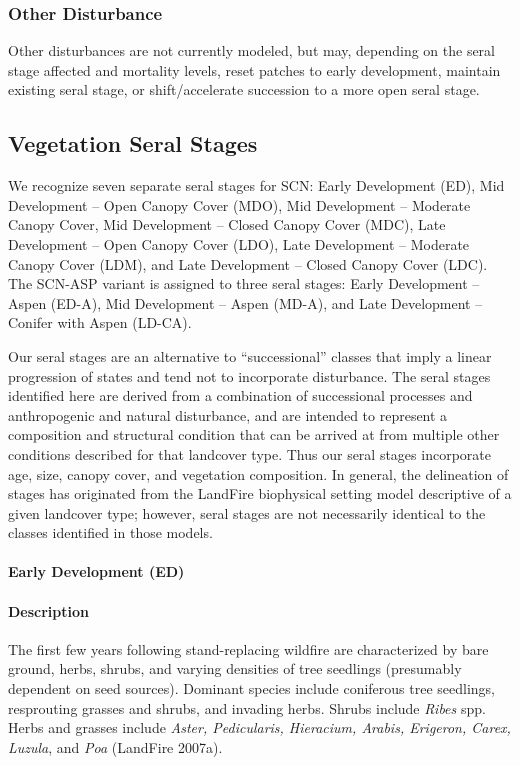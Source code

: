 \subsubsection{Other Disturbance}
Other disturbances are not currently modeled, but may, depending on the seral stage affected and mortality levels, reset patches to early development, maintain existing seral stage, or shift/accelerate succession to a more open seral stage. 

\subsection*{Vegetation Seral Stages}
We recognize seven separate seral stages for SCN: Early Development (ED), Mid Development – Open Canopy Cover (MDO), Mid Development – Moderate Canopy Cover, Mid Development – Closed Canopy Cover (MDC), Late Development – Open Canopy Cover (LDO), Late Development – Moderate Canopy Cover (LDM), and Late Development – Closed Canopy Cover (LDC). The SCN-ASP variant is assigned to three seral stages: Early Development – Aspen (ED-A), Mid Development – Aspen (MD-A), and Late Development – Conifer with Aspen (LD-CA).

Our seral stages are an alternative to ``successional'' classes that imply a linear progression of states and tend not to incorporate disturbance. The seral stages identified here are derived from a combination of successional processes and anthropogenic and natural disturbance, and are intended to represent a composition and structural condition that can be arrived at from multiple other conditions described for that landcover type. Thus our seral stages incorporate age, size, canopy cover, and vegetation composition. In general, the delineation of stages has originated from the LandFire biophysical setting model descriptive of a given landcover type; however, seral stages are not necessarily identical to the classes identified in those models.


\paragraph{Early Development (ED)}

\paragraph{Description} The first few years following stand-replacing wildfire are characterized by bare ground, herbs, shrubs, and varying densities of tree seedlings (presumably dependent on seed sources). Dominant species include coniferous tree seedlings, resprouting grasses and shrubs, and invading herbs. Shrubs include \emph{Ribes} spp. Herbs and grasses include \emph{Aster, Pedicularis, Hieracium, Arabis, Erigeron, Carex, Luzula}, and \emph{Poa} (LandFire 2007a).

